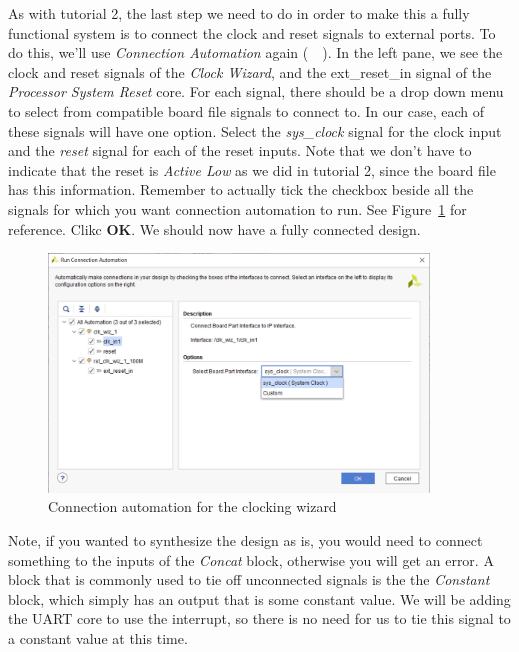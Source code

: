 \documentclass[11pt]{article}
\begin{document}
As with tutorial 2, the last step we need to do in order to make this a fully functional system is to connect the clock and reset signals to external ports. To do this, we'll use \textit{Connection Automation} again
(~~). 
In the left pane, we see the clock and reset signals of the \textit{Clock Wizard}, and the ext\_reset\_in signal of the \textit{Processor System Reset} core. For each signal, there should be a drop down menu to select from compatible board file signals to connect to. In our case, each of these signals will have one option. Select the \textit{sys\_clock} signal for the clock input and the \textit{reset} signal for each of the reset inputs. Note that we don't have to indicate that the reset is \textit{Active Low} as we did in tutorial 2, since the board file has this information. Remember to actually tick the checkbox beside all the signals for which you want connection automation to run. See Figure~\ref{fig:conn_auto_clock2} for reference. Clikc \textbf{OK}. We should now have a fully connected design.

\begin{figure}[h]
    \centering
    \includegraphics[width=0.9\textwidth]{images/conn_auto_clock2.png}
    \caption{Connection automation for the clocking wizard}
    \label{fig:conn_auto_clock2}
\end{figure}

Note, if you wanted to synthesize the design as is, you would need to connect something to the inputs of the \textit{Concat} block, otherwise you will get an error. A block that is commonly used to tie off unconnected signals is the the \textit{Constant} block, which simply has an output that is some constant value. We will be adding the UART core to use the interrupt, so there is no need for us to tie this signal to a constant value at this time.
\end{document}
